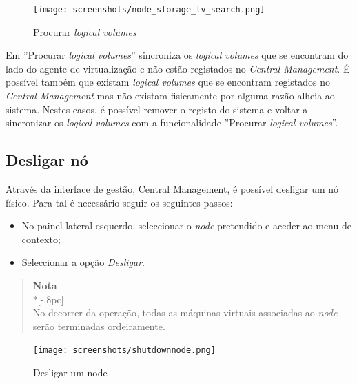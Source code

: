 \begin{figure}[H]
        \begin{center}
        \texttt{[image: screenshots/node\_storage\_lv\_search.png]}
        \caption{Procurar \emph{logical volumes}}
        \label{fig:storage_lv_search}
        \end{center}
\end{figure}

Em ''Procurar \emph{logical volumes}'' sincroniza os \emph{logical volumes} que se encontram do lado do agente de virtualização e não estão registados no \emph{Central Management}.
É possível também que existam \emph{logical volumes} que se encontram registados no \emph{Central Management} mas não existam fisicamente por alguma razão alheia ao sistema. 
Nestes casos, é possível remover o registo do sistema e voltar a sincronizar os \emph{logical volumes} com a funcionalidade ''Procurar \emph{logical volumes}''.

\subsection{Desligar nó}
\label{sub:desligar_no}
Através da interface de gestão, Central Management, é possível desligar um nó físico. Para tal é necessário seguir os seguintes passos:

\begin{itemize}
\item No painel lateral esquerdo, seleccionar o \textit{node} pretendido e aceder ao menu de contexto;
\item Seleccionar a opção \textit{Desligar}.
\end{itemize}

\begin{quote}
    {\large \bf Nota} \\*[-.8pc]
    \underline{\hspace{6in}} \\
    No decorrer da operação, todas as máquinas virtuais associadas ao \textit{node} serão terminadas ordeiramente.
\end{quote}


\begin{figure}[H]
        \begin{center}
        \texttt{[image: screenshots/shutdownnode.png]}
        \caption{Desligar um node}
        \label{fig:storage_lv_ctx}
        \end{center}
\end{figure}

